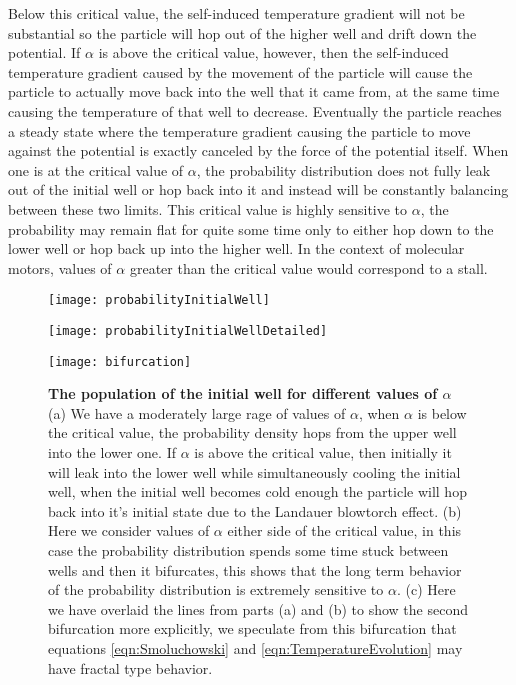 Below this critical value, the self-induced temperature gradient will not be substantial so the particle will hop out of the higher well and drift down the potential. If $\alpha$ is above the critical value, however, then the self-induced temperature gradient caused by the movement of the particle will cause the particle to actually move back into the well that it came from, at the same time causing the temperature of that well to decrease. Eventually the particle reaches a steady state where the temperature gradient causing the particle to move against the potential is exactly canceled by the force of the potential itself. When one is at the critical value of $\alpha$, the probability distribution does not fully leak out of the initial well or hop back into it and instead will be constantly balancing between these two limits. This critical value is highly sensitive to $\alpha$, the probability may remain flat for quite some time only to either hop down to the lower well or hop back up into the higher well. In the context of molecular motors, values of $\alpha$ greater than the critical value would correspond to a stall.

\begin{figure}
	\begin{minipage}{0.49\textwidth}
		\texttt{[image: probabilityInitialWell]}
		\subcaption{}
	\end{minipage}
	\begin{minipage}{0.49\textwidth}
		\texttt{[image: probabilityInitialWellDetailed]}
		\subcaption{}
	\end{minipage}
	
	\begin{minipage}{\textwidth}
		\center
		\texttt{[image: bifurcation]}
		\subcaption{}
	\end{minipage}
	\caption{\textbf{The population of the initial well for different values of $\alpha$} (a) We have a moderately large rage of values of $\alpha$, when $\alpha$ is below the critical value, the probability density hops from the upper well into the lower one. If $\alpha$ is above the critical value, then initially it will leak into the lower well while simultaneously cooling the initial well, when the initial well becomes cold enough the particle will hop back into it's initial state due to the Landauer blowtorch effect. (b) Here we consider values of $\alpha$ either side of the critical value, in this case the probability distribution spends some time stuck between wells and then it bifurcates, this shows that the long term behavior of the probability distribution is extremely sensitive to $\alpha$. (c) Here we have overlaid the lines from parts (a) and (b) to show the second bifurcation more explicitly, we speculate from this bifurcation that equations \ref{eqn:Smoluchowski} and \ref{eqn:TemperatureEvolution} may have fractal type behavior. \label{fig:alphaCritical}}
\end{figure}

